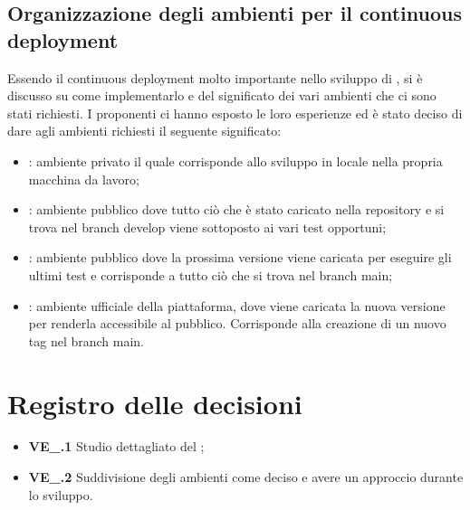 \subsection{Organizzazione degli ambienti per il continuous deployment}
Essendo il continuous deployment molto importante nello sviluppo di \NomeProgetto, si è discusso su come implementarlo e del significato dei vari ambienti che ci sono stati richiesti. I proponenti ci hanno esposto le loro esperienze ed è stato deciso di dare agli ambienti richiesti il seguente significato:
\begin{itemize}
	\item {}: ambiente privato il quale corrisponde allo sviluppo in locale nella propria macchina da lavoro;
	\item {}: ambiente pubblico dove tutto ciò che è stato caricato nella repository e si trova nel branch develop viene sottoposto ai vari test opportuni;
	\item {}: ambiente pubblico dove la prossima versione viene caricata per eseguire gli ultimi test e corrisponde a tutto ciò che si trova nel branch main;
	\item {}: ambiente ufficiale della piattaforma, dove viene caricata la nuova versione per renderla accessibile al pubblico. Corrisponde alla creazione di un nuovo tag nel branch main.
\end{itemize}

\section{Registro delle decisioni}
\begin{itemize}
	\item \textbf{VE\_\Data.1} Studio dettagliato del ;
	\item \textbf{VE\_\Data.2} Suddivisione degli ambienti come deciso e avere un approccio  durante lo sviluppo.
\end{itemize}
